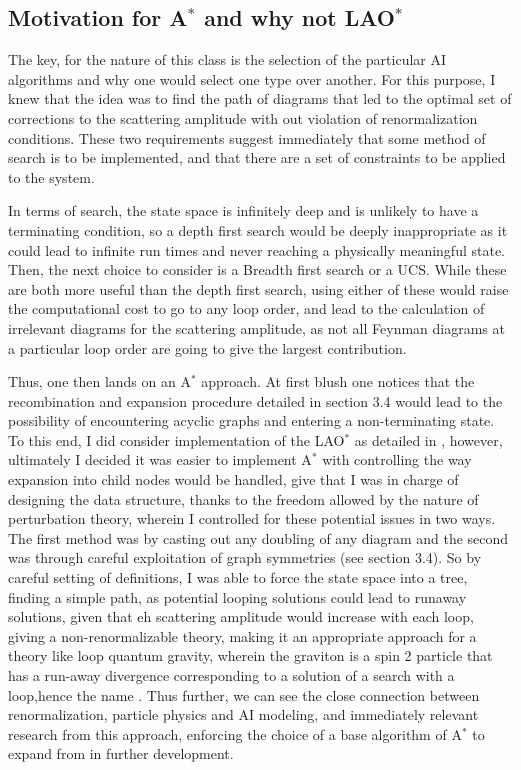 \documentclass{article}
\begin{document}
\subsection{Motivation for A$^*$ and why not LAO$^*$}
\hspace{0.5 cm}The key, for the nature of this class is the selection of the particular AI algorithms and why one would select one type over another. 
For this purpose, I knew that the idea was to find the path of diagrams that led to the optimal set of corrections to the scattering amplitude with out violation of renormalization conditions. These two requirements suggest immediately that some method of search is to be implemented, and that there are a set of constraints to be applied to the system. 

\hspace{0.5 cm} In terms of search, the state space is infinitely deep and is unlikely to have a terminating condition, so a depth first search would be deeply inappropriate as it could lead to infinite run times and never reaching a physically meaningful state. 
Then, the next choice to consider is a Breadth first search or a UCS. While these are both more useful than the depth first search, using either of these would raise the computational cost to go to any loop order, and lead to the calculation of irrelevant diagrams for the scattering amplitude, as not all Feynman diagrams at a particular loop order are going to give the largest contribution. 

\hspace{0.5 cm} Thus, one then lands on an A$^*$ approach. At first blush one notices that the recombination and expansion procedure detailed in section 3.4 would lead to the possibility of encountering acyclic graphs and entering a non-terminating state. To this end, I did consider implementation of the LAO$^*$ as detailed in \cite{Hansen}, however, ultimately I decided it was easier to implement A$^*$ with controlling the way expansion into child nodes would be handled, give that I was in charge of designing the data structure, thanks to the freedom allowed by the nature of perturbation theory, wherein I controlled for these potential issues in two ways. 
The first method was by casting out any doubling of any diagram and the second was through careful exploitation of graph symmetries (see section 3.4).
So by careful setting of definitions, I was able to force the state space into a tree, finding a simple path, as potential looping solutions could lead to runaway solutions, given that eh scattering amplitude would increase with each loop, giving a non-renormalizable theory, making it an appropriate approach for a theory like loop quantum gravity, wherein the graviton is a spin 2 particle that has a run-away divergence corresponding to a solution of a search with a loop,hence the name \cite{Bodendorfer2020} \cite{Jacobson2007}. Thus further, we can see the close connection between renormalization, particle physics and AI modeling, and immediately relevant research from this approach, enforcing the choice of a base algorithm of A$^*$ to expand from in further development.
\end{document}

